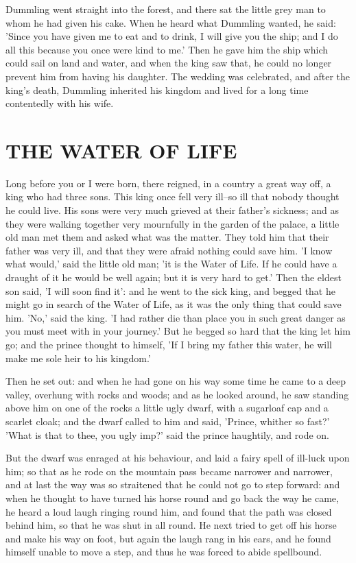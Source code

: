 \documentclass[12pt]{book}
\begin{document}
Dummling went straight into the forest, and there sat the little grey
man to whom he had given his cake. When he heard what Dummling wanted,
he said: 'Since you have given me to eat and to drink, I will give you
the ship; and I do all this because you once were kind to me.' Then he
gave him the ship which could sail on land and water, and when the
king saw that, he could no longer prevent him from having his
daughter. The wedding was celebrated, and after the king's death,
Dummling inherited his kingdom and lived for a long time contentedly
with his wife.




\chapter{THE WATER OF LIFE}

Long before you or I were born, there reigned, in a country a great
way off, a king who had three sons. This king once fell very ill--so
ill that nobody thought he could live. His sons were very much grieved
at their father's sickness; and as they were walking together very
mournfully in the garden of the palace, a little old man met them and
asked what was the matter. They told him that their father was very
ill, and that they were afraid nothing could save him. 'I know what
would,' said the little old man; 'it is the Water of Life. If he could
have a draught of it he would be well again; but it is very hard to
get.' Then the eldest son said, 'I will soon find it': and he went to
the sick king, and begged that he might go in search of the Water of
Life, as it was the only thing that could save him. 'No,' said the
king. 'I had rather die than place you in such great danger as you
must meet with in your journey.' But he begged so hard that the king
let him go; and the prince thought to himself, 'If I bring my father
this water, he will make me sole heir to his kingdom.'

Then he set out: and when he had gone on his way some time he came to
a deep valley, overhung with rocks and woods; and as he looked around,
he saw standing above him on one of the rocks a little ugly dwarf,
with a sugarloaf cap and a scarlet cloak; and the dwarf called to him
and said, 'Prince, whither so fast?' 'What is that to thee, you ugly
imp?' said the prince haughtily, and rode on.

But the dwarf was enraged at his behaviour, and laid a fairy spell of
ill-luck upon him; so that as he rode on the mountain pass became
narrower and narrower, and at last the way was so straitened that he
could not go to step forward: and when he thought to have turned his
horse round and go back the way he came, he heard a loud laugh ringing
round him, and found that the path was closed behind him, so that he
was shut in all round. He next tried to get off his horse and make his
way on foot, but again the laugh rang in his ears, and he found
himself unable to move a step, and thus he was forced to abide
spellbound.
\end{document}

